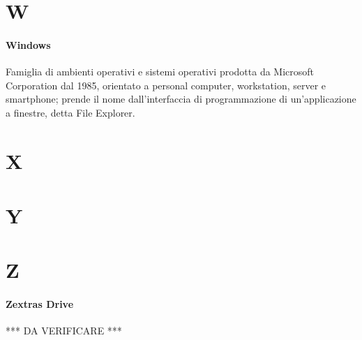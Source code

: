 \documentclass[]{article}
\begin{document}
	\newpage
	
	\section*{W}
	
	\paragraph*{Windows}
	Famiglia di ambienti operativi e sistemi operativi prodotta da Microsoft Corporation dal 1985, orientato a personal computer, workstation, server e smartphone; prende il nome dall'interfaccia di programmazione di un'applicazione a finestre, detta File Explorer.
	
	\newpage
	
	\section*{X}

	\newpage
	
	\section*{Y}

	\newpage
	
	\section*{Z}
	
	\paragraph*{Zextras Drive}
	*** DA VERIFICARE ***
\end{document}
